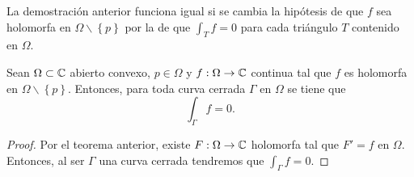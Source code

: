 \begin{observation}
	La demostración anterior funciona igual si se cambia la hipótesis de que $\displaystyle f $ sea holomorfa en $\displaystyle \Omega \backslash \left\{ p\right\}  $ por la de que $\displaystyle \int _{T}f =0 $ para cada triángulo $\displaystyle T $ contenido en $\displaystyle \Omega  $. 
\end{observation}
\begin{theorem}
	Sean $\displaystyle \Omega \subset \mathbb{C} $ abierto convexo, $\displaystyle p \in \Omega  $ y $\displaystyle f : \Omega \to \mathbb{C} $ continua tal que $\displaystyle f $ es holomorfa en $\displaystyle \Omega \backslash \left\{ p\right\}  $. Entonces, para toda curva cerrada $\displaystyle \Gamma $ en $\displaystyle \Omega  $ se tiene que 
	\[\int _{\Gamma }f =0 .\]
\end{theorem}
\begin{proof}
Por el teorema anterior, existe $\displaystyle F : \Omega \to \mathbb{C} $ holomorfa tal que $\displaystyle F'=f $ en $\displaystyle \Omega  $. Entonces, al ser $\displaystyle \Gamma $ una curva cerrada tendremos que $\displaystyle \int _{\Gamma}f =0 $.
\end{proof}
